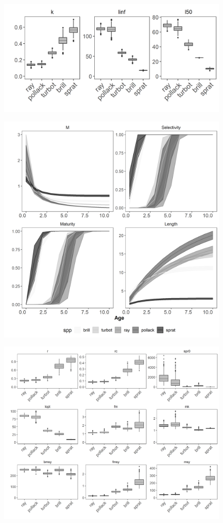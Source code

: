 \documentclass[preprint,review,12pt]{elsarticle}
\begin{document}
\begin{figure}[]\centering\includegraphics[width=5in]{fig1.png}\caption{}\label{fig:fig1}\end{figure}
\begin{figure}[]\centering\includegraphics[width=5in]{fig2.png}\caption{}\label{fig:fig2}\end{figure}
\begin{figure}[]\centering\includegraphics[width=5in]{fig3.png}\caption{}\label{fig:fig3}\end{figure}
\end{document}
